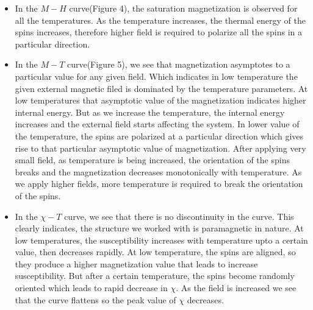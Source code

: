 \documentclass[24pt]{article}
\begin{document}
\begin{large}
\begin{itemize}


\item In the $M-H$ curve(Figure 4), the saturation magnetization is observed for all the temperatures. As the temperature increases, the thermal energy of the spins increases, therefore higher field is required to polarize all the spins in a particular direction.\\
\item In the $M-T$ curve(Figure 5), we see that magnetization asymptotes to a particular value for any given field. Which indicates in low temperature the given external magnetic filed is dominated by the temperature parameters. At low temperatures that asymptotic value of the magnetization indicates higher internal energy.  But as we increase the temperature, the internal energy increases and the external field starts affecting the system. 
In lower value of the temperature, the spins are polarized at a particular direction which gives rise to that particular asymptotic value of magnetization.  After applying very small field, as temperature is being increased, the orientation of the spins breaks and the magnetization decreases monotonically with temperature. As we apply higher fields, more temperature is required to break the orientation of the spins.\\
\item In the $\chi - T$ curve, we see that there is no discontinuity  in the curve. This clearly indicates, the structure we worked with is paramagnetic in nature. At low temperatures, the susceptibility increases with temperature upto a certain value, then decreases rapidly. At low temperature, the spins are aligned,  so they produce a higher magnetization value that leads to increase susceptibility. But after a certain temperature, the spins become randomly oriented which leads to rapid decrease in $\chi$. As the field is increased we see that the curve flattens so the peak value of $\chi$ decreases. 

\end{itemize}
\end{large}
\end{document}
